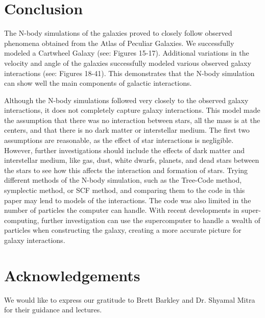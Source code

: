 \documentclass[linenumbers,RNAAS,trackchanges]{aastex631}
\begin{document}
\section{Conclusion} \label{sec:results}
The N-body simulations of the galaxies proved to closely follow observed phenomena obtained from the  Atlas of Peculiar Galaxies. We successfully modeled a Cartwheel Galaxy (see: Figures 15-17). Additional variations in the velocity and angle of the galaxies successfully modeled various observed galaxy interactions (see: Figures 18-41). This demonstrates that the N-body simulation can show well the main components of galactic interactions. 

Although the N-body simulations followed very closely to the observed galaxy interactions, it does not completely capture galaxy interactions. This model made the assumption that there was no interaction between stars, all the mass is at the centers, and that there is no dark matter or interstellar medium. The first two assumptions are reasonable, as the effect of star interactions is negligible. However, further investigations should include the effects of dark matter and interstellar medium, like gas, dust, white dwarfs, planets, and dead stars between the stars to see how this affects the interaction and formation of stars. Trying different methods of the N-body simulation, such as the Tree-Code method, symplectic method, or SCF method, and comparing them to the code in this paper may lend to models of the interactions. The code was also limited in the number of particles the computer can handle. With recent developments in super-computing, further investigation can use the supercomputer to handle a wealth of particles when constructing the galaxy, creating a more accurate picture for galaxy interactions.

\newpage



\section{Acknowledgements} \label{sec:acknowledgements}
We would like to express our gratitude to Brett Barkley and Dr. Shyamal Mitra for their guidance and lectures. 
\end{document}
